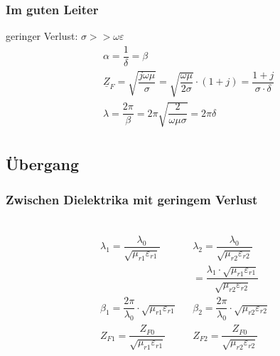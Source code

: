 \subsubsection{Im guten Leiter}
geringer Verlust: $\sigma >>\omega\varepsilon$
\begin{align*}
     & \alpha = \dfrac{1}{\delta}= \beta                                                                                                           \\
     & \underline{Z}_F = \sqrt{\dfrac{j\omega\mu}{\sigma}} = \sqrt{\dfrac{\omega\mu}{2\sigma}}\cdot\left(1+j\right)=\dfrac{1+j}{\sigma\cdot\delta} \\
     & \lambda = \dfrac{2\pi}{\beta} = 2\pi \sqrt{\dfrac{2}{\omega\mu\sigma}}=2\pi\delta                                                           \\
\end{align*}

\subsection{Übergang}
\subsubsection{Zwischen Dielektrika mit geringem Verlust}
\\
\begin{align}
    \lambda_1 = \dfrac{\lambda_0}{\sqrt{\mu_{r1}\varepsilon_{r1}}} && \lambda_2 = \dfrac{\lambda_0}{\sqrt{\mu_{r2}\varepsilon_{r2}}} \\
     && = \dfrac{\lambda_1\cdot\sqrt{\mu_{r1}\varepsilon_{r1}}}{\sqrt{\mu_{r2}\varepsilon_{r2}}}\\
     \beta_1 = \dfrac{2\pi}{\lambda_0}\cdot\sqrt{\mu_{r1}\varepsilon_{r1}} && \beta_2 = \dfrac{2\pi}{\lambda_0}\cdot\sqrt{\mu_{r2}\varepsilon_{r2}}\\
     Z_{F1} = \dfrac{Z_{F0}}{\sqrt{\mu_{r1}\varepsilon_{r1}}}&& Z_{F2} = \dfrac{Z_{F0}}{\sqrt{\mu_{r2}\varepsilon_{r2}}}
    \end{align} 
